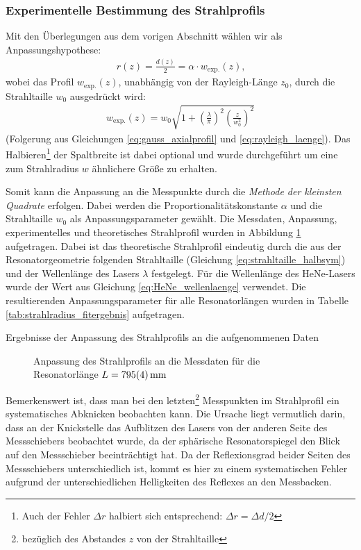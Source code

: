 \documentclass[11pt, a4paper]{article}
\numberwithin{equation}{section}
\begin{document}
\subsubsection{Experimentelle Bestimmung des Strahlprofils}
Mit den Überlegungen aus dem vorigen Abschnitt wählen wir als Anpassungshypothese:
\begin{align}
	 r(z) = \frac{d(z)}{2} = \alpha \cdot w_\mathrm{exp.}(z) \text{,}
\end{align}
wobei das Profil $w_\mathrm{exp.}(z)$, unabhängig von der Rayleigh-Länge $z_0$, durch die Strahltaille $w_0$ ausgedrückt wird:
\begin{align}
	w_\mathrm{exp.}(z) = w_0 \sqrt{1 + \left( \frac{\lambda}{\pi} \right)^2 \left( \frac{z}{w_0^2}\right)^2}
\end{align}
(Folgerung aus Gleichungen \ref{eq:gauss_axialprofil} und \ref{eq:rayleigh_laenge}).
Das Halbieren\footnote{Auch der Fehler $\Delta r$ halbiert sich entsprechend: $\Delta r = \Delta d / 2$} der Spaltbreite ist dabei optional und wurde durchgeführt um eine zum Strahlradius $w$ ähnlichere Größe zu erhalten.

Somit kann die Anpassung an die Messpunkte durch die \emph{Methode der kleinsten Quadrate} erfolgen.
Dabei werden die Proportionalitätskonstante $\alpha$ und die Strahltaille $w_0$ als Anpassungsparameter gewählt.
Die Messdaten, Anpassung, experimentelles und theoretisches Strahlprofil wurden in Abbildung \ref{fig:ex_strahlradius} aufgetragen.
Dabei ist das theoretische Strahlprofil eindeutig durch die aus der Resonatorgeometrie folgenden Strahltaille (Gleichung \ref{eq:strahltaille_halbsym}) und der Wellenlänge des Lasers $\lambda$ festgelegt.
Für die Wellenlänge des HeNe-Lasers wurde der Wert aus Gleichung \ref{eq:HeNe_wellenlaenge} verwendet.
Die resultierenden Anpassungsparameter für alle Resonatorlängen wurden in Tabelle \ref{tab:strahlradius_fitergebnis} aufgetragen.
\begin{table}[h]
	\centering
	
	\caption{Ergebnisse der Anpassung des Strahlprofils an die aufgenommenen Daten}
	\label{tab:strahlradius_fitergebnis}
\end{table}
\begin{figure}[h]
	\centering
	
	\caption{Anpassung des Strahlprofils an die Messdaten für die Resonatorlänge $L = \SI{795 +- 4}{\milli\metre}$}
	\label{fig:ex_strahlradius}
\end{figure}

Bemerkenswert ist, dass man bei den letzten\footnote{bezüglich des Abstandes $z$ von der Strahltaille} Messpunkten im Strahlprofil ein systematisches Abknicken beobachten kann.
Die Ursache liegt vermutlich darin, dass an der Knickstelle das Aufblitzen des Lasers von der anderen Seite des Messschiebers beobachtet wurde, da der sphärische Resonatorspiegel den Blick auf den Messschieber beeinträchtigt hat.
Da der Reflexionsgrad beider Seiten des Messschiebers unterschiedlich ist, kommt es hier zu einem systematischen Fehler aufgrund der unterschiedlichen Helligkeiten des Reflexes an den Messbacken.
\end{document}
